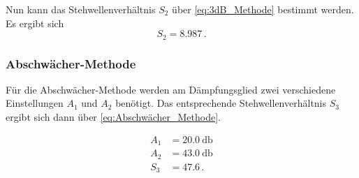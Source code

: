 Nun kann das Stehwellenverhältnis $S_2$ über \autoref{eq:3dB_Methode} bestimmt werden.
Es ergibt sich
\begin{equation*}
    S_2 = \num{8.987} \, .
\end{equation*}

\subsubsection{Abschwächer-Methode}
\label{sssec:a7}

Für die Abschwächer-Methode werden am Dämpfungsglied zwei verschiedene Einstellungen $A_1$ und $A_2$ benötigt.
Das entsprechende Stehwellenverhältnis $S_3$ ergibt sich dann über \autoref{eq:Abschwächer_Methode}.

\begin{align*}
    A_1 &= \SI{20.0}{\decibel} \\
    A_2 &= \SI{43.0}{\decibel} \\
    S_3 &= 47.6 \, .
\end{align*}
